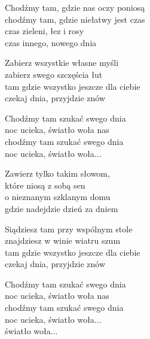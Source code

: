 \begin{text}
    Chodźmy tam, gdzie nas oczy poniosą\\
    chodźmy tam, gdzie niełatwy jest czas\\
    czas zieleni, łez i rosy\\
    czas innego, nowego dnia

    Zabierz wszystkie własne myśli\\
    zabierz swego szczęścia łut\\
    tam gdzie wszystko jeszcze dla ciebie\\
    czekaj dnia, przyjdzie znów

    Chodźmy tam szukać swego dnia\\
    noc ucieka, światło woła nas\\
    chodźmy tam szukać swego dnia\\
    noc ucieka, światło woła...

    Zawierz tylko takim słowom,\\
    które niosą z sobą sen\\
    o nieznanym szklanym domu\\
    gdzie nadejdzie dzień za dniem

    Siądziesz tam przy wspólnym stole\\
    znajdziesz w winie wiatru szum\\
    tam gdzie wszystko jeszcze dla ciebie\\
    czekaj dnia, przyjdzie znów

    Chodźmy tam szukać swego dnia\\
    noc ucieka, światło woła nas\\
    chodźmy tam szukać swego dnia\\
    noc ucieka, światło woła...\\
    światło woła...
\end{text}
\begin{chord}

\end{chord}